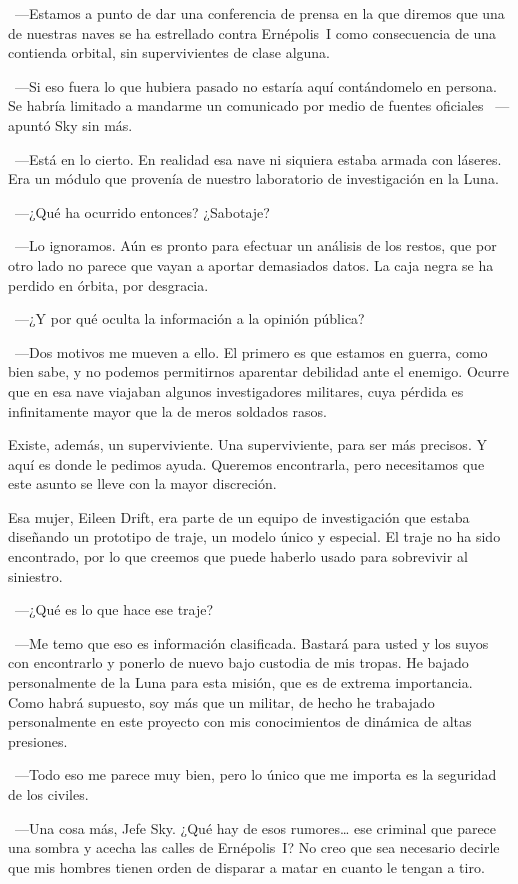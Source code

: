 ~---Estamos a punto de dar una conferencia de prensa en la que diremos que una de nuestras naves se ha estrellado contra Ernépolis~I como consecuencia de una contienda orbital, sin supervivientes de clase alguna.

~---Si eso fuera lo que hubiera pasado no estaría aquí contándomelo en persona. Se habría limitado a mandarme un comunicado por medio de fuentes oficiales ~---apuntó Sky sin más.

~---Está en lo cierto. En realidad esa nave ni siquiera estaba armada con láseres. Era un módulo que provenía de nuestro laboratorio de investigación en la Luna.

~---¿Qué ha ocurrido entonces? ¿Sabotaje?

~---Lo ignoramos. Aún es pronto para efectuar un análisis de los restos, que por otro lado no parece que vayan a aportar demasiados datos. La caja negra se ha perdido en órbita, por desgracia.

~---¿Y por qué oculta la información a la opinión pública?

~---Dos motivos me mueven a ello. El primero es que estamos en guerra, como bien sabe, y no podemos permitirnos aparentar debilidad ante el enemigo. Ocurre que en esa nave viajaban algunos investigadores militares, cuya pérdida es infinitamente mayor que la de meros soldados rasos.

\rquoti{}Existe, además, un superviviente. Una superviviente, para ser más precisos. Y aquí es donde le pedimos ayuda. Queremos encontrarla, pero necesitamos que este asunto se lleve con la mayor discreción.

\rquoti{}Esa mujer, Eileen Drift, era parte de un equipo de investigación que estaba diseñando un prototipo de traje, un modelo único y especial. El traje no ha sido encontrado, por lo que creemos que puede haberlo usado para sobrevivir al siniestro.

~---¿Qué es lo que hace ese traje?

~---Me temo que eso es información clasificada. Bastará para usted y los suyos con encontrarlo y ponerlo de nuevo bajo custodia de mis tropas. He bajado personalmente de la Luna para esta misión, que es de extrema importancia. Como habrá supuesto, soy más que un militar, de hecho he trabajado personalmente en este proyecto con mis conocimientos de dinámica de altas presiones.

~---Todo eso me parece muy bien, pero lo único que me importa es la seguridad de los civiles.

~---Una cosa más, Jefe Sky. ¿Qué hay de esos rumores\dots{} ese criminal que parece una sombra y acecha las calles de Ernépolis~I? No creo que sea necesario decirle que mis hombres tienen orden de disparar a matar en cuanto le tengan a tiro.

